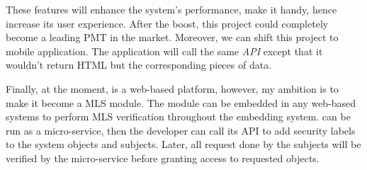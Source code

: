 These features will enhance the system's performance, make it handy, hence increase its user experience.
After the boost, this project could completely become a leading PMT in the market.
Moreover, we can shift this project to mobile application. 
The application will call the same \emph{API} except that it wouldn't return HTML but the corresponding pieces of data.

Finally, at the moment, \myProject is a web-based platform, however, my ambition is to make it become a MLS module.
The module can be embedded in any web-based systems to perform MLS verification throughout the embedding system.
\myProject can be run as a micro-service, then the developer can call its API to add security labels to the system objects and subjects.
Later, all request done by the subjects will be verified by the micro-service before granting access to requested objects.

